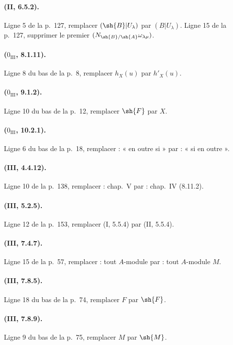 \paragraph{(II, 6.5.2).}
Ligne 5 de la p.~127, remplacer $(\sh{B}|U_\lambda)$ par
$(B|U_\lambda)$. Ligne 15 de la p.~127, supprimer le premier
$(N_{\sh{B}/\sh{A}}\omega_{\lambda\mu})$.

\paragraph{($0_{\mathrm{III}}$, 8.1.11).}
Ligne 8 du bas de la p.~8, remplacer $h_X(u)$ par $h'_X(u)$.

\paragraph{($0_{\mathrm{III}}$, 9.1.2).}
Ligne 10 du bas de la p.~12, remplacer $\sh{F}$ par $X$.

\paragraph{($0_{\mathrm{III}}$, 10.2.1).}
Ligne 6 du bas de la p.~18, remplacer : « en outre si » par : « si en
outre ».

\paragraph{(III, 4.4.12).}
Ligne 10 de la p.~138, remplacer : chap.~V par : chap.~IV (8.11.2).

\paragraph{(III, 5.2.5).}
Ligne 12 de la p.~153, remplacer (I, 5.5.4) par (II, 5.5.4).

\paragraph{(III, 7.4.7).}
Ligne 15 de la p.~57, remplacer : tout $A$-module par : tout
$A$-module $M$.

\paragraph{(III, 7.8.5).}
Ligne 18 du bas de la p.~74, remplacer $F$ par $\sh{F}$.

\paragraph{(III, 7.8.9).}
Ligne 9 du bas de la p.~75, remplacer $M$ par $\sh{M}$.

